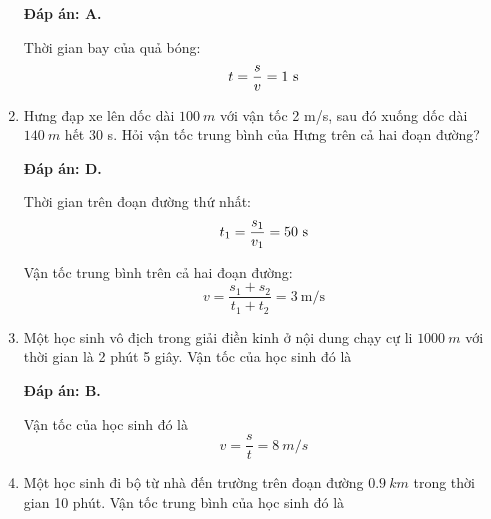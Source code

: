 \begin{enumerate}[label=\bfseries Câu \arabic*:]
	\hideall
	{\textbf{Đáp án: A.}
		
		Thời gian bay của quả bóng:
		$$t=\dfrac{s}{v} = 1\ \text s$$
		
	}
	\item {}
	
	
	{Hưng đạp xe lên dốc dài $\SI{100}{m}$ với vận tốc 2 m/s, sau đó xuống dốc dài $\SI{140}{m}$ hết 30 s. Hỏi vận tốc trung bình của Hưng trên cả hai đoạn đường?
	}
	
	\hideall
	{\textbf{Đáp án: D.}
		
		Thời gian trên đoạn đường thứ nhất:
		$$t_1=\dfrac{s_1}{v_1} = 50\ \text s$$
		
		Vận tốc trung bình trên cả hai đoạn đường:
		$$v=\dfrac{s_1+s_2}{t_1+t_2} = 3\ \text {m/s}$$
		
	}
	\item {}
	
	
	{
		Một học sinh vô địch trong giải điền kinh ở nội dung chạy cự li $\SI{1000}{m}$ với thời gian là 2 phút 5 giây. Vận tốc của học sinh đó là
	}
	
	\hideall
	{\textbf{Đáp án: B.}
		
		Vận tốc của học sinh đó là
		$$v=\dfrac{s}{t} = \SI{8}{m/s}$$
		
	}
	
	\item {}
	
	
	{Một học sinh đi bộ từ nhà đến trường trên đoạn đường $\SI{0.9}{km}$ trong thời gian 10 phút. Vận tốc trung bình của học sinh đó là
		
}
\end{enumerate}
